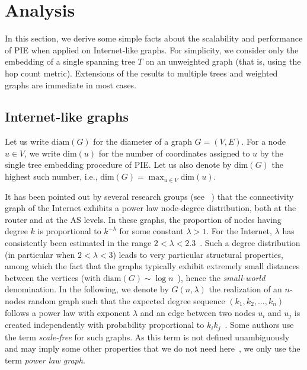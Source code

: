 \documentclass[conference]{IEEEtran}
\begin{document}
\section{Analysis}
\label{sec:analysis}

In this section, we derive some simple facts about the scalability and performance of PIE when applied on Internet-like graphs. For simplicity, we consider only the embedding of a single spanning tree $T$ on an unweighted graph (that is, using the hop count metric). Extensions of the results to multiple trees and weighted graphs are immediate in most cases. 

\subsection{Internet-like graphs}


Let us write $\text{diam}(G)$ for the diameter of a graph $G = (V,E)$. For a node $u \in V$, we write $\text{dim}(u)$ for the number of coordinates assigned to $u$ by the single tree embedding procedure of PIE. Let us also denote by $\text{dim}(G)$ the highest such number, i.e., $\text{dim}(G) = \max_{u \in V}{\text{dim}(u)}$.

It has been pointed out by several research groups
(see ~\cite{faloutsos99, mahadevan06})
that the connectivity graph of the Internet exhibits a power law node-degree distribution, both at the router and at the AS levels. In these graphs, the proportion of nodes having degree $k$ is proportional to $k^{-\lambda}$ for some constant $\lambda > 1$. For the Internet, $\lambda$ has consistently been estimated in the range $2 < \lambda < 2.3$~\cite{pastor-satorras04}. Such a degree distribution (in particular when $2 < \lambda < 3$) leads to very particular structural properties, among which the fact that the graphs typically exhibit extremely small distances between the vertices 
(with $\text{diam}(G) \sim \log n$~\cite{Chung02theaverage}),  
hence the \emph{small-world} denomination. In the following, we denote by $G(n, \lambda)$ the realization of an $n$-nodes random graph such that the expected degree sequence $(k_1, k_2, ...,k_n)$ follows a power law with exponent $\lambda$ and an edge between two nodes $u_i$ and $u_j$ is created independently with probability proportional to $k_ik_j$~\cite{Chung02theaverage}.
Some authors use the term \emph{scale-free} for such graphs. As this term is not defined unambiguously and may imply some other properties that we do not need here~\cite{li:scalefree}, we only use the term \emph{power law graph}.
\end{document}
